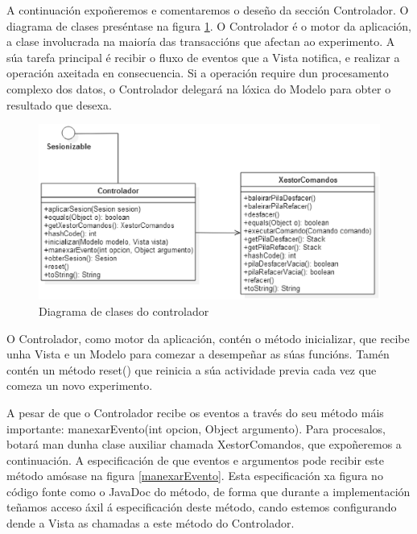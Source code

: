 A continuación expoñeremos e comentaremos o deseño da sección Controlador. O diagrama de clases preséntase na figura \ref{UMLcontrolador}. O Controlador é o motor da aplicación, a clase involucrada na maioría das transaccións que afectan ao experimento. A súa tarefa principal é recibir o fluxo de eventos que a Vista notifica, e realizar a operación axeitada en consecuencia. Si a operación require dun procesamento complexo dos datos, o Controlador delegará na lóxica do Modelo para obter o resultado que desexa.

\begin{figure}
\centering
\includegraphics[width=\textwidth,height=\textheight,keepaspectratio]{figuras/UMLcontrolador}
\caption{Diagrama de clases do controlador}
\label{UMLcontrolador}
\end{figure}

O Controlador, como motor da aplicación, contén o método inicializar, que recibe unha Vista e un Modelo para comezar a desempeñar as súas funcións. Tamén contén un método reset() que reinicia a súa actividade previa cada vez que comeza un novo experimento.

A pesar de que o Controlador recibe os eventos a través do seu método máis importante: manexarEvento(int opcion, Object argumento). Para procesalos, botará man dunha clase auxiliar chamada XestorComandos, que expoñeremos a continuación. A especificación de que eventos e argumentos pode recibir este método amósase na figura \ref{manexarEvento}. Esta especificación xa figura no código fonte como o JavaDoc do método, de forma que durante a implementación teñamos acceso áxil á especificación deste método, cando estemos configurando dende a Vista as chamadas a este método do Controlador.

